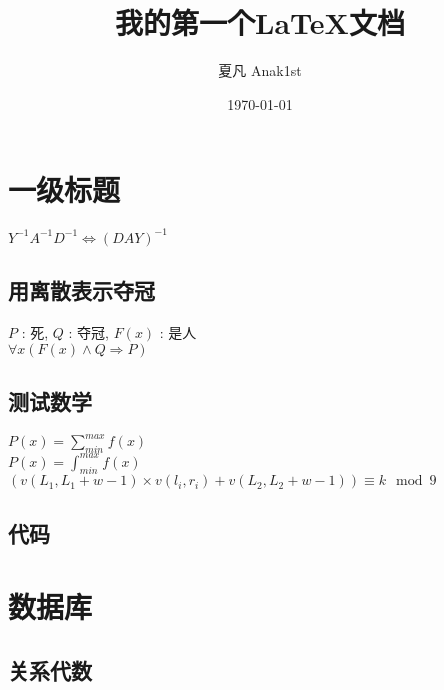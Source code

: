 \documentclass[11pt, a4paper, oneside]{article}
\title{我的第一个\LaTeX 文档}
\author{夏凡 Anak1st}
\date{\today}
\begin{document}
\maketitle

\section{一级标题}

$ Y^{-1} A^{-1} D^{-1} \iff (DAY)^{-1} $

\subsection{用离散表示夺冠}
\begin{center}
    $P$ : 死, $Q$ : 夺冠, $F(x)$ : 是人 \\
    ${\forall}x(F(x) \wedge Q \Rightarrow P)$
\end{center}

\subsection{测试数学}
\begin{center}
    $P(x)=\sum_{min}^{max}f(x)$ \\
    $P(x)=\int_{min}^{max}f(x)$ \\
    $(v(L_1, L_1 + w - 1) \times v(l_i, r_i) + v(L_2, L_2 + w - 1)) \equiv k \mod 9$
\end{center}

\newpage
\subsection{代码}


\section{数据库}

\subsection{关系代数}
\end{document}

